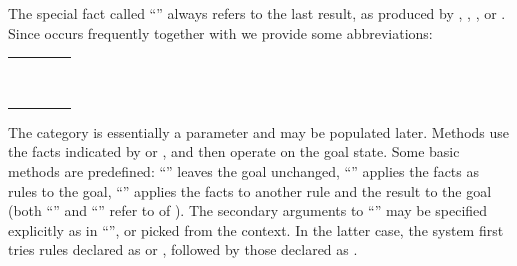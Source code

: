 \begin{isabellebody}
\begin{isamarkuptext}
  The special fact called ``\hyperlink{fact.this}{\mbox{}}'' always refers to the last
  result, as produced by \hyperlink{command.note}{\mbox{}}, \hyperlink{command.assume}{\mbox{}}, \hyperlink{command.have}{\mbox{}}, or \hyperlink{command.show}{\mbox{}}.  Since \hyperlink{command.note}{\mbox{}} occurs
  frequently together with \hyperlink{command.then}{\mbox{}} we provide some
  abbreviations:

  \medskip
  \begin{tabular}{rcl}
    \hyperlink{command.from}{\mbox{\isa{\isacommand{from}}}}~\isa{a} & \isa{{\isaliteral{22}{\isachardoublequote}}{\isaliteral{5C3C65717569763E}{\isasymequiv}}{\isaliteral{22}{\isachardoublequote}}} & \hyperlink{command.note}{\mbox{\isa{\isacommand{note}}}}~\isa{a}~\hyperlink{command.then}{\mbox{\isa{\isacommand{then}}}} \\
    \hyperlink{command.with}{\mbox{\isa{\isacommand{with}}}}~\isa{a} & \isa{{\isaliteral{22}{\isachardoublequote}}{\isaliteral{5C3C65717569763E}{\isasymequiv}}{\isaliteral{22}{\isachardoublequote}}} & \hyperlink{command.from}{\mbox{\isa{\isacommand{from}}}}~\isa{{\isaliteral{22}{\isachardoublequote}}a\ {\isaliteral{5C3C414E443E}{\isasymAND}}\ this{\isaliteral{22}{\isachardoublequote}}} \\
  \end{tabular}
  \medskip

  The  category is essentially a parameter and may be
  populated later.  Methods use the facts indicated by \hyperlink{command.then}{\mbox{}} or \hyperlink{command.using}{\mbox{}}, and then operate on the goal state.
  Some basic methods are predefined: ``\hyperlink{method.-}{\mbox{}}'' leaves the goal
  unchanged, ``\hyperlink{method.this}{\mbox{}}'' applies the facts as rules to the
  goal, ``\hyperlink{method.Pure.rule}{\mbox{}}'' applies the facts to another rule and the
  result to the goal (both ``\hyperlink{method.this}{\mbox{}}'' and ``\hyperlink{method.Pure.rule}{\mbox{}}''
  refer to \hyperlink{inference.resolution}{\mbox{}} of
  ).  The secondary arguments to
  ``\hyperlink{method.Pure.rule}{\mbox{}}'' may be specified explicitly as in ``'', or picked from the context.  In the latter case, the system
  first tries rules declared as \hyperlink{attribute.Pure.elim}{\mbox{}} or
  \hyperlink{attribute.Pure.dest}{\mbox{}}, followed by those declared as \hyperlink{attribute.Pure.intro}{\mbox{}}.


\end{isamarkuptext}
\end{isabellebody}
